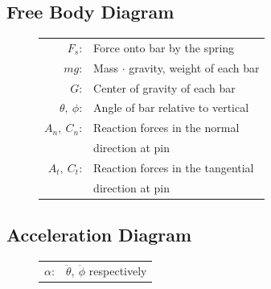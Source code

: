\documentclass[12pt]{report}
\begin{document}
\begin{flushleft}
\section{Free Body Diagram}
\begin{figure}[ht]
   \begin{minipage}[c]{.225\textwidth}
      
   \end{minipage}%
   \begin{minipage}[c]{.55\textwidth}
     \center
     \begin{tabular}{rl}
     $F_s$:&Force onto bar by the spring\\
     $mg$:&Mass $\cdot$ gravity, weight of each bar\\
     $G$:&Center of gravity of each bar\\
     $\theta,~\phi$:& Angle of bar relative to vertical\\
     $A_n,~C_n$:& Reaction forces in the normal \\ & direction at pin\\
     $A_t,~C_t$:& Reaction forces in the tangential \\ & direction at pin\\
   \end{tabular}
   \end{minipage}%
  \begin{minipage}[c]{.225\textwidth}
    \vspace{2.8ex}
    \hspace{2ex}
     
  \end{minipage}
\end{figure}
\vspace{-3ex}
\subsection*{Acceleration Diagram}
\begin{figure}[ht]
   \begin{minipage}[c]{.25\textwidth}
      
   \end{minipage}%
   \begin{minipage}[c]{.5\textwidth}
     \center
     \begin{tabular}{rl}
     $\alpha$:& $\ddot{\theta},~\ddot{\phi}$ respectively\\
   \end{tabular}
   \end{minipage}%
  \begin{minipage}[c]{.25\textwidth}
    \hspace{2ex}
     
  \end{minipage}
\end{figure}
\vspace{-5ex}

\end{flushleft}
\end{document}
